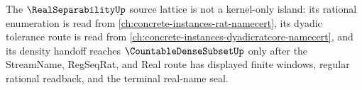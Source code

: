 The $\RealSeparabilityUp$ source lattice is not a kernel-only island: its rational enumeration is read from \autoref{ch:concrete-instances-rat-namecert}, its dyadic tolerance route is read from \autoref{ch:concrete-instances-dyadicratcore-namecert}, and its density handoff reaches $\CountableDenseSubsetUp$ only after the StreamName, RegSeqRat, and Real route has displayed finite windows, regular rational readback, and the terminal real-name seal.
